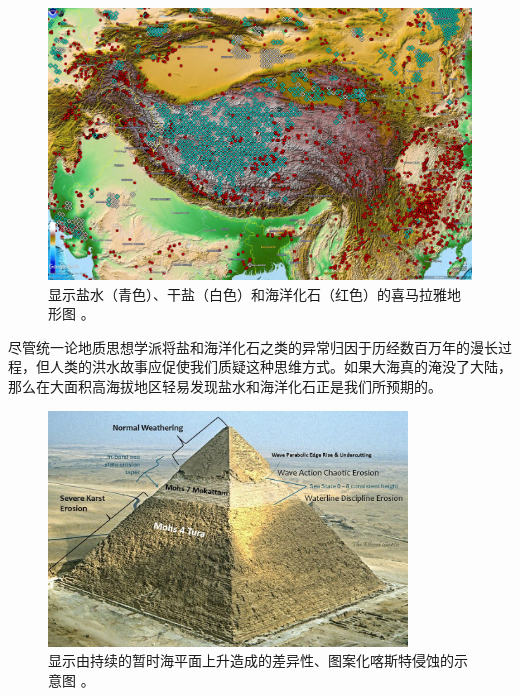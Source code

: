 \documentclass[10pt,twocolumn,letterpaper]{article}
\begin{document}
\begin{figure}[t]
\begin{center}
   \includegraphics[width=1\linewidth]{tibet.jpg}
\end{center}
   \caption{显示盐水（青色）、干盐（白色）和海洋化石（红色）的喜马拉雅地形图 \cite{15,16,86,87}。}
\label{fig:3}
\label{fig:onecol}
\end{figure}

尽管统一论地质思想学派将盐和海洋化石之类的异常归因于历经数百万年的漫长过程，但人类的洪水故事应促使我们质疑这种思维方式。如果大海真的淹没了大陆，那么在大面积高海拔地区轻易发现盐水和海洋化石正是我们所预期的。

\begin{figure}[t]
\begin{center}
\includegraphics[width=0.85\textwidth]{khafre.jpg}
\end{center}
   \caption{显示由持续的暂时海平面上升造成的差异性、图案化喀斯特侵蚀的示意图 \cite{27}。}
\label{fig:4}
\end{figure}
\end{document}
